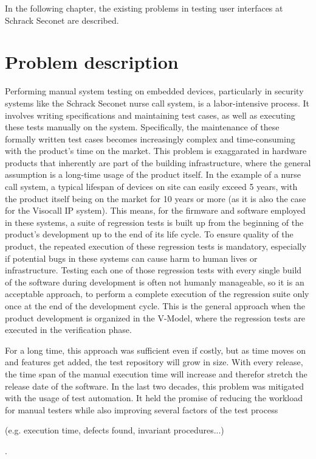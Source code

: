 \documentclass[Proposal,BIC,english,IEEE]{BASE/twbook} %
\begin{document}
In the following chapter, the existing problems in testing user interfaces at Schrack Seconet are described.

\newpage
\pagestyle{ExperienceFromAuthor}
\chapter{Problem description}
Performing manual system testing on embedded devices, particularly in security systems like the Schrack Seconet nurse call system, is a labor-intensive process. It involves writing specifications and maintaining test cases, as well as executing these tests manually on the system. Specifically, the maintenance of these formally written test cases becomes increasingly complex and time-consuming with the product's time on the market. This problem is exaggarated in hardware products that inherently are part of the building infrastructure, where the general assumption is a long-time usage of the product itself. In the example of a nurse call system, a typical lifespan of devices on site can easily exceed 5 years, with the product itself being on the market for 10 years or more (as it is also the case for the Visocall IP system\autocite{VisocallIPModerne}).
This means, for the firmware and software employed in these systems, a suite of regression tests is built up from the beginning of the product's development up to the end of its life cycle. To ensure quality of the product, the repeated execution of these regression tests is mandatory, especially if potential bugs in these systems can cause harm to human lives or infrastructure.
Testing each one of those regression tests with every single build of the software during development is often not humanly manageable, so it is an acceptable approach, to perform a complete execution of the regression suite only once at the end of the development cycle. This is the general approach when the product development is organized in the V-Model, where the regression tests are executed in the verification phase.

For a long time, this approach was sufficient even if costly, but as time moves on and features get added, the test repository will grow in size. With every release, the time span of the manual execution time will increase and therefor stretch the release date of the software.
In the last two decades, this problem was mitigated with the usage of test automation. It held the promise of reducing the workload for manual testers while also improving several factors of the test process \begin{em}(e.g. execution time, defects found, invariant procedures...)\end{em}.
\end{document}
